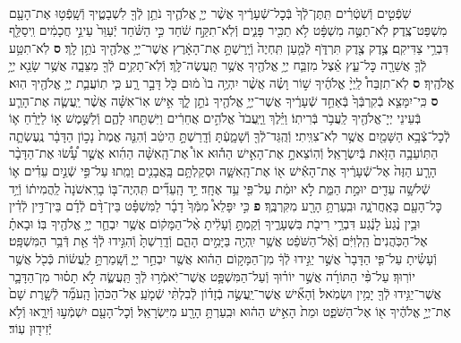 \documentclass[twoside, openany, parskip=half, 11pt]{book}
\begin{document}
\begin{footnotesize}
\begin{multicols}{2}
\\
שֹֽׁפְֿטִ֣ים וְֿשֹֽׁטְֿרִ֗ים תִּֽתֶּן־לְֿךָ֙ בְּֿכׇל־שְֿׁעָרֶ֔יךָ אֲשֶׁ֨ר יְיָ֧ אֱלֹהֶ֛יךָ נֹתֵ֥ן לְֿךָ֖ לִשְׁבָטֶ֑יךָ וְֿשָֽׁפְֿט֥וּ אֶת־הָעָ֖ם מִשְׁפַּט־צֶֽדֶק׃ לֹֽא־תַטֶּ֣ה מִשְׁפָּ֔ט לֹ֥א תַכִּ֖יר פָּנִ֑ים וְֿלֹֽא־תִקַּ֣ח שֹׁ֔חַד כִּ֣י הַשֹּׁ֗חַד יְֿעַוֵּר֙ עֵינֵ֣י חֲכָמִ֔ים וִֽיסַלֵּ֖ף דִּבְרֵ֥י צַדִּיקִֽם׃ צֶ֥דֶק צֶ֖דֶק תִּרְדֹּ֑ף לְֿמַ֤עַן תִּֽחְיֶה֙ וְֿיָֽרַשְׁתָּ֣ אֶת־הָאָ֔רֶץ אֲשֶׁר־יְיָ֥ אֱלֹהֶ֖יךָ נֹתֵ֥ן לָֽךְ׃ \textbf{ס}
לֹֽא־תִטַּ֥ע לְֿךָ֛ אֲשֵׁרָ֖ה כׇּל־עֵ֑ץ אֵ֗צֶל מִזְבַּ֛ח יְיָ֥ אֱלֹהֶ֖יךָ אֲשֶׁ֥ר תַּֽעֲשֶׂה־לָּֽךְ׃ וְֿלֹֽא־תָקִ֥ים לְֿךָ֖ מַצֵּבָ֑ה אֲשֶׁ֥ר שָׂנֵ֖א יְיָ֥ אֱלֹהֶֽיךָ׃ \textbf{ס} לֹֽא־תִזְבַּח֩ לַֽיְיָ֨ אֱלֹהֶ֜יךָ שׁ֣וֹר וָשֶׂ֗ה אֲשֶׁ֨ר יִהְיֶ֥ה בוֹ֙ מ֔וּם כֹּ֖ל דָּבָ֣ר רָ֑ע כִּ֧י תֽוֹעֲבַ֛ת יְיָ֥ אֱלֹהֶ֖יךָ הֽוּא׃ \textbf{ס} כִּֽי־יִמָּצֵ֤א בְֿקִרְבְּֿךָ֙ בְּֿאַחַ֣ד שְֿׁעָרֶ֔יךָ אֲשֶׁר־יְיָ֥ אֱלֹהֶ֖יךָ נֹתֵ֣ן לָ֑ךְ אִ֣ישׁ אֽוֹ־אִשָּׁ֗ה אֲשֶׁ֨ר יַֽעֲשֶׂ֧ה אֶת־הָרַ֛ע בְּֿעֵינֵי יְיָ־אֱלֹהֶ֖יךָ לַֽעֲבֹ֥ר בְּֿרִיתֽוֹ׃ וַיֵּ֗לֶךְ וַֽיַּֽעֲבֹד֙ אֱלֹהִ֣ים אֲחֵרִ֔ים וַיִּשְׁתַּ֖חוּ לָהֶ֑ם וְֿלַשֶּׁ֣מֶשׁ א֣וֹ לַיָּרֵ֗חַ א֛וֹ לְֿכׇל־צְֿבָ֥א הַשָּׁמַ֖יִם אֲשֶׁ֥ר לֹֽא־צִוִּֽיתִי׃ וְֿהֻֽגַּד־לְֿךָ֖ וְֿשָׁמָ֑עְֿתָּ וְֿדָֽרַשְׁתָּ֣ הֵיטֵ֔ב וְֿהִנֵּ֤ה אֱמֶת֙ נָכ֣וֹן הַדָּבָ֔ר נֶֽעֶשְׂתָ֛ה הַתּֽוֹעֵבָ֥ה הַזֹּ֖את בְּֿיִשְׂרָאֵֽל׃ וְֿהֽוֹצֵאתָ֣ אֶת־הָאִ֣ישׁ הַה֡וּא אוֹ֩ אֶת־הָֽאִשָּׁ֨ה הַהִ֜וא אֲשֶׁ֣ר עָ֠שׂ֠וּ אֶת־הַדָּבָ֨ר הָרָ֤ע הַזֶּה֙ אֶל־שְֿׁעָרֶ֔יךָ אֶת־הָאִ֕ישׁ א֖וֹ אֶת־הָֽאִשָּׁ֑ה וּסְקַלְתָּ֥ם בָּֽאֲבָנִ֖ים וָמֵֽתוּ׃ עַל־פִּ֣י שְֿׁנַ֣יִם עֵדִ֗ים א֛וֹ שְֿׁלשָׁ֥ה עֵדִ֖ים יוּמַ֣ת הַמֵּ֑ת לֹ֣א יוּמַ֔ת עַל־פִּ֖י עֵ֥ד אֶחָֽד׃ יַ֣ד הָֽעֵדִ֞ים תִּֽהְיֶה־בּ֤וֹ בָרִֽאשֹׁנָה֙ לַֽהֲמִית֔וֹ וְֿיַ֥ד כׇּל־הָעָ֖ם בָּאַֽחֲרֹנָ֑ה וּבִֽעַרְתָּ֥ הָרָ֖ע מִקִּרְבֶּֽךָ׃ \textbf{פ}
כִּ֣י יִפָּלֵא֩ מִמְּֿךָ֙ דָבָ֜ר לַמִּשְׁפָּ֗ט בֵּין־דָּ֨ם לְֿדָ֜ם בֵּין־דִּ֣ין לְֿדִ֗ין וּבֵ֥ין נֶ֨גַע֙ לָנֶ֔גַע דִּבְרֵ֥י רִיבֹ֖ת בִּשְׁעָרֶ֑יךָ וְֿקַמְתָּ֣ וְֿעָלִ֔יתָ אֶ֨ל־הַמָּק֔וֹם אֲשֶׁ֥ר יִבְחַ֛ר יְיָ֥ אֱלֹהֶ֖יךָ בּֽוֹ׃ וּבָאתָ֗ אֶל־הַכֹּֽהֲנִים֙ הַֽלְוִיִּ֔ם וְֿאֶ֨ל־הַשֹּׁפֵ֔ט אֲשֶׁ֥ר יִֽהְיֶ֖ה בַּיָּמִ֣ים הָהֵ֑ם וְֿדָֽרַשְׁתָּ֙ וְֿהִגִּ֣ידוּ לְֿךָ֔ אֵ֖ת דְּֿבַ֥ר הַמִּשְׁפָּֽט׃ וְֿעָשִׂ֗יתָ עַל־פִּ֤י הַדָּבָר֙ אֲשֶׁ֣ר יַגִּ֣ידוּ לְֿךָ֔ מִן־הַמָּק֣וֹם הַה֔וּא אֲשֶׁ֖ר יִבְחַ֣ר יְיָ֑ וְֿשָֽׁמַרְתָּ֣ לַֽעֲשׂ֔וֹת כְּֿכֹ֖ל אֲשֶׁ֥ר יוֹרֽוּךָ׃
עַל־פִּ֨י הַתּוֹרָ֜ה אֲשֶׁ֣ר יוֹר֗וּךָ וְֿעַל־הַמִּשְׁפָּ֛ט אֲשֶׁר־יֹֽאמְֿר֥וּ לְֿךָ֖ תַּֽעֲשֶׂ֑ה לֹ֣א תָס֗וּר מִן־הַדָּבָ֛ר אֲשֶׁר־יַגִּ֥ידוּ לְֿךָ֖ יָמִ֥ין וּשְׂמֹֽאל׃ וְֿהָאִ֞ישׁ אֲשֶׁר־יַֽעֲשֶׂ֣ה בְֿזָד֗וֹן לְֿבִלְתִּ֨י שְֿׁמֹ֤עַֽ אֶל־הַכֹּהֵן֙ הָֽעֹמֵ֞ד לְֿשָׁ֤רֶת שָׁם֙ אֶת־יְיָ֣ אֱלֹהֶ֔יךָ א֖וֹ אֶל־הַשֹּׁפֵ֑ט וּמֵת֙ הָאִ֣ישׁ הַה֔וּא וּבִֽעַרְתָּ֥ הָרָ֖ע מִיִּשְׂרָאֵֽל׃ וְֿכׇל־הָעָ֖ם יִשְׁמְֿע֣וּ וְֿיִרָ֑אוּ וְֿלֹ֥א יְֿזִיד֖וּן עֽוֹד׃


\end{multicols}
\end{footnotesize}
\end{document}
